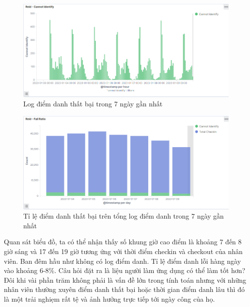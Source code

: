 \begin{figure}[H] %
    \centering %
    \includegraphics[width=1\textwidth]{figures/cannot_identify.png} 
    \caption{Log điểm danh thất bại trong 7 ngày gần nhất} %
    \label{fig:elk_01}
\end{figure}

\begin{figure}[H] %
    \centering %
    \includegraphics[width=1\textwidth]{figures/fail_ratio.png} 
    \caption{Tỉ lệ điểm danh thất bại trên tổng log điểm danh trong 7 ngày gần nhất} %
    \label{fig:elk_01}
\end{figure}

Quan sát biểu đồ, ta có thể nhận thấy số khung giờ cao điểm là khoảng 7 đến 8 giờ sáng và 17 đến 19 giờ tương ứng với thời điểm checkin và checkout của nhân viên. Ban đêm hầu như không có log điểm danh. Tỉ lệ điểm danh lỗi hàng ngày vào khoảng 6-8\%. Câu hỏi đặt ra là liệu người làm ứng dụng có thể làm tốt hơn? Đôi khi vài phần trăm không phải là vấn đề lớn trong tính toán nhưng với những nhân viên thường xuyên điểm danh thất bại hoặc thời gian điểm danh lâu thì đó là một trải nghiẹm rất tệ và ảnh hưởng trực tiếp tới ngày công của họ. 

